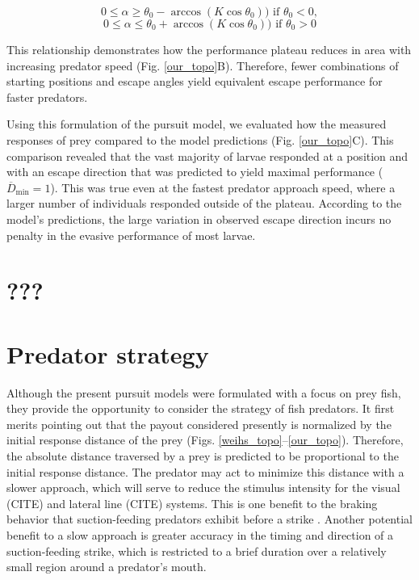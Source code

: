 \documentclass[12pt]{article}
\newcommand{\ol}{\overline}
\begin{document}
%
\begin{equation}
    0 \leq \alpha  \geq \theta_0 -\arccos(K \cos \theta_0))    \text{  if } \theta_0 < 0 ,
 \end{equation}
\begin{equation}
    0 \leq \alpha  \leq  \theta_0  + \arccos(K \cos \theta_0))    \text{  if } \theta_0 > 0 
\end{equation}
%

This relationship demonstrates how the performance plateau reduces in area with increasing predator speed (Fig. \ref{our_topo}B). Therefore, fewer combinations of starting positions and escape angles yield equivalent escape performance for faster predators.

Using this formulation of the pursuit model, we evaluated how the measured responses of prey compared to the model predictions (Fig. \ref{our_topo}C). This comparison revealed that the vast majority of larvae responded at a position and with an escape direction that was predicted to yield maximal performance  ($\ol D_{\text{min}}=1$). This was true even at the fastest predator approach speed, where a larger number of individuals responded outside of the plateau.  According to the model's predictions, the large variation in observed escape direction incurs no penalty in the evasive performance of most larvae. 

\section{???}



\section{Predator strategy}

Although the present pursuit models were formulated with a focus on prey fish, they provide the opportunity to consider the strategy of fish predators. It first merits pointing out that the payout considered presently is normalized by the initial response distance of the prey (Figs. \ref{weihs_topo}--\ref{our_topo}). Therefore, the absolute distance traversed by a prey is predicted to be proportional to the initial response distance. The predator may act to minimize this distance with a slower approach, which will serve to reduce the stimulus intensity for the visual (CITE) and lateral line (CITE) systems. This is one benefit to the braking behavior that suction-feeding predators exhibit before a strike \citep{Higham:2007go, Higham:2005iu}. Another potential benefit to a slow approach is greater accuracy in the timing and direction of a suction-feeding strike, which is restricted to a brief duration over a relatively small region around a predator's mouth. 
\end{document}
